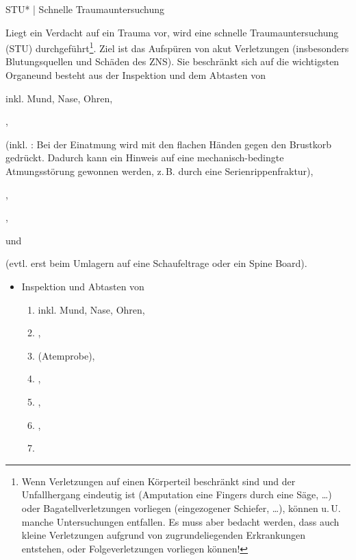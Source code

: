 \TextSlide
{{STU}* | Schnelle Traumauntersuchung}
{%
Liegt ein Verdacht auf ein Trauma
vor, wird eine schnelle Traumauntersuchung (STU)
durchgeführt\footnote{Wenn Verletzungen auf einen 
Körperteil beschränkt sind und
der Unfallhergang eindeutig ist (Amputation eine Fingers
durch eine Säge, \ldots) oder Bagatellverletzungen vorliegen
(eingezogener Schiefer, \ldots), können u.\,U. manche
Untersuchungen entfallen. Es muss aber bedacht werden, dass
auch kleine Verletzungen aufgrund von zugrundeliegenden
Erkrankungen entstehen, oder Folgeverletzungen vorliegen
können!}. 
Ziel ist das Aufspüren von akut
 Verletzungen (insbesonders Blutungsquellen und Schäden des ZNS). 
Sie beschränkt sich auf
die wichtigsten Organeund  besteht aus der  Inspektion
  und dem Abtasten von
  \begin{compactenum}
    \item {} inkl. Mund, Nase, Ohren,
    \item {},
    \item {} 
    (inkl. : Bei der Einatmung wird mit den flachen Händen
    gegen den Brustkorb gedrückt. 
    Dadurch kann ein Hinweis auf eine mechanisch-bedingte Atmungsstörung 
    gewonnen werden, z.\,B. durch eine Serienrippenfraktur),
    \item {},
    \item {},
    \item {} und
    \item {} (evtl. erst beim Umlagern auf eine Schaufeltrage oder ein Spine Board).
  \end{compactenum}
}
{\begin{itemize}
  \item Inspektion
  und Abtasten von
  \begin{enumerate}
    \item {} inkl. Mund, Nase, Ohren,
    \item {},
    \item {} (Atemprobe),
    \item {},
    \item {},
    \item {},
    \item {}
  \end{enumerate}
\end{itemize}}
{}
{}
{}




